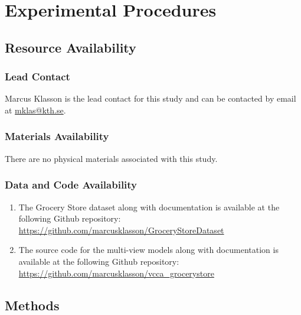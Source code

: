 \section{Experimental Procedures}
\label{sec:experimental_procedures}

\subsection{Resource Availability}

\subsubsection{Lead Contact}
Marcus Klasson is the lead contact for this study and can be contacted by email at \url{mklas@kth.se}.

\subsubsection{Materials Availability}
There are no physical materials associated with this study.

\subsubsection{Data and Code Availability}
\begin{enumerate}
\item The Grocery Store dataset along with documentation is available at the following Github repository: \url{https://github.com/marcusklasson/GroceryStoreDataset}
\item The source code for the multi-view models along with documentation is available at the following Github repository: \url{https://github.com/marcusklasson/vcca_grocerystore}
\end{enumerate}


\subsection{Methods}\label{sec:methods}

